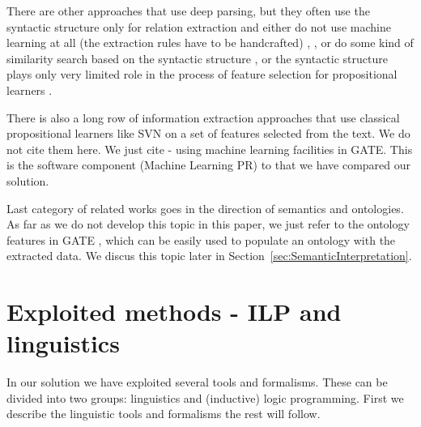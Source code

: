 \documentclass[runningheads,a4paper]{llncs}
\begin{document}

There are other approaches that use deep parsing, but they often use the syntactic structure only for relation extraction and either do not use machine learning at all (the extraction rules have to be handcrafted) 
\cite{Yakushiji2001},
\cite{RelEx},
\cite{Buyko:dependencyGraphs}
or do some kind of similarity search based on the syntactic structure
\cite{Etzioni08informationExtraction},
\cite{Wang:SimilarityTreeSkeletons}
or the syntactic structure plays only very limited role in the process of feature selection for propositional learners %
\cite{Bunescu:DependencyPaths}.

There is also a long row of information extraction approaches that use classical propositional learners like SVN on a set of features selected from the text. We do not cite them here. We just cite \cite{Yaoyong09a} - using machine learning facilities in GATE. This is the software component (Machine Learning PR) to that we have compared our solution.

Last category of related works goes in the direction of semantics and ontologies. As far as we do not develop this topic in this paper, we just refer to the ontology features in GATE \cite{Bon04b}, which can be easily used to populate an ontology with the extracted data. We discus this topic later in Section~\ref{sec:SemanticInterpretation}.




\section{Exploited methods - ILP and linguistics}
In our solution we have exploited several tools and formalisms. These can be divided into two groups: linguistics and (inductive) logic programming. First we describe the linguistic tools and formalisms the rest will follow.
\end{document}
